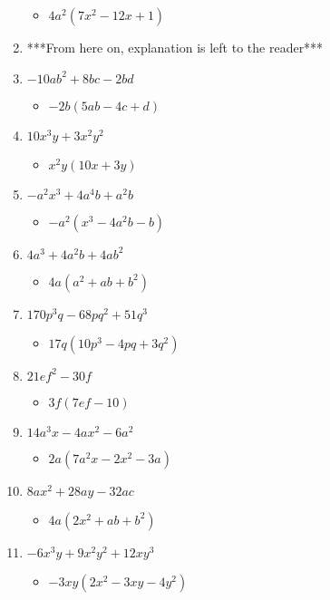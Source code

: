 \begin{enumerate}
\begin{itemize}
  \item [] $4a^{2}(7x^{2}-12x+1)$
  \end{itemize}
\item [] ***From here on, explanation is left to the reader***
\item $-10ab^{2} + 8bc - 2bd$
  \begin{itemize}
  \item $-2b(5ab-4c+d)$
  \end{itemize}
\item $10x^{3}y + 3x^{2}y^{2}$
  \begin{itemize}
  \item $x^{2}y(10x+3y)$
  \end{itemize}
\item $-a^{2}x^{3} + 4a^{4}b + a^{2}b$
  \begin{itemize}
  \item $-a^{2}(x^{3}-4a^{2}b-b)$
  \end{itemize}
\item $4a^{3} + 4a^{2}b + 4ab^{2}$
  \begin{itemize}
  \item $4a(a^{2}+ab+b^{2})$
  \end{itemize}
\item $170p^{3}q - 68pq^{2} + 51q^{3}$
  \begin{itemize}
  \item $17q(10p^{3}-4pq+3q^{2})$
  \end{itemize}
\item $21ef^{2} - 30f$
  \begin{itemize}
  \item $3f(7ef-10)$
  \end{itemize}
\item $14a^{3}x - 4ax^{2} - 6a^{2}$
  \begin{itemize}
  \item $2a(7a^{2}x-2x^{2}-3a)$
  \end{itemize}
\item $8ax^{2} + 28ay - 32ac$
  \begin{itemize}
  \item $4a(2x^{2}+ab+b^{2})$
  \end{itemize}
\item $-6x^{3}y + 9x^{2}y^{2} + 12xy^{3}$
  \begin{itemize}
  \item $-3xy(2x^{2}-3xy-4y^{2})$

\end{itemize}
\end{enumerate}
